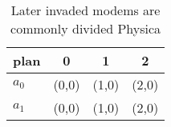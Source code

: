 \documentclass[a4paper]{article}
\begin{document}
\begin{table}
\begin{adjustbox}{width=0.6\columnwidth}
\begin{tabular}{|l|l|l|l|}
\hline
\textbf{plan} & \multicolumn{1}{c|}{\textbf{0}} & \multicolumn{1}{c|}{\textbf{1}} & \multicolumn{1}{c|}{\textbf{2}} \\ \hline
\textbf{$a_0$}  & (0,0) & (1,0) & (2,0) \\ \hline
\textbf{$a_1$}  & (0,0) & (1,0) & (2,0) \\ \hline
\end{tabular}
\end{adjustbox}
\caption{Later invaded modems are commonly divided Physica
}
\end{table}
\end{document}
